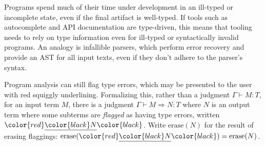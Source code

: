 \documentclass[acmsmall]{acmart}
\newcommand{\squnder}[1]{\color{red}\underline{{\color{black}#1}}\color{black}}
\newcommand{\erase}{\mathrm{erase}}
\begin{document}
Programs spend much of their time under development in an ill-typed or incomplete state, even if the
final artifact is well-typed. If tools such as autocomplete and API documentation are type-driven,
this means that tooling needs to rely on type information even for ill-typed
or syntactically invalid programs. An analogy is infallible parsers, which perform error recovery and
provide an AST for all input texts, even if they don't adhere to the parser's syntax.

Program analysis can still flag type errors, which may be presented
to the user with red squiggly underlining. Formalizing this, rather
than a judgment
$\Gamma\vdash M:T$, for an input term $M$, there is a judgment
$\Gamma \vdash M \Rightarrow N : T$ where $N$ is an output term
where some subterms are \emph{flagged} as having type errors, written $\squnder{N}$. Write $\erase(N)$
for the result of erasing flaggings: $\erase(\squnder{N}) = \erase(N)$.
\end{document}
